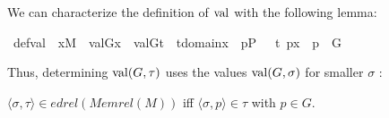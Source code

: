 We can characterize the definition of $\operatorname{val}$ with the following lemma:

\begin{isabelle}
\isamarkupfalse%
\ def{\isacharunderscore}val{\isacharcolon}\ \ {\isachardoublequoteopen}x{\isasymin}M\ {\isasymLongrightarrow}\ val{\isacharparenleft}G{\isacharcomma}x{\isacharparenright}\ {\isacharequal}\ {\isacharbraceleft}val{\isacharparenleft}G{\isacharcomma}t{\isacharparenright}\ {\isachardot}{\isachardot}\ t{\isasymin}domain{\isacharparenleft}x{\isacharparenright}\ {\isacharcomma}\ {\isasymexists}p{\isasymin}P\ {\isachardot}\ \ {\isasymlangle}t{\isacharcomma}\ p{\isasymrangle}{\isasymin}x\ {\isasymand}\ p\ {\isasymin}\ G\ {\isacharbraceright}{\isachardoublequoteclose}
\end{isabelle}

Thus, determining $\operatorname{val}(G,\tau)$ uses the values $\operatorname{val}(G,\sigma)$ for smaller $\sigma$ :

    $\langle \sigma , \tau \rangle \in edrel(Memrel(M)) $ iff $\langle \sigma , p \rangle \in \tau$ with $p \in G$. 
